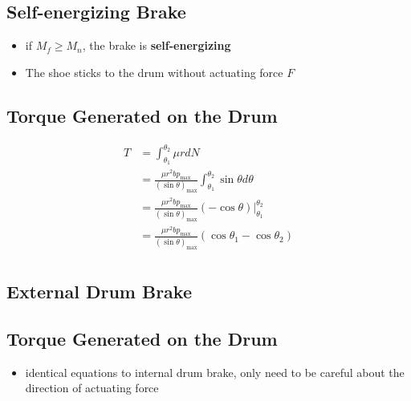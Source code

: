 \documentclass[
10pt,
a4paper,
openany,
svgnames,
]{book}
\begin{document}
\subsection*{Self-energizing Brake}
\label{sec:org67d4715}

\begin{itemize}
\item if \(M_f \geqslant M_n\), the brake is \textbf{self-energizing}

\item The shoe sticks to the drum without actuating force \(F\)
\end{itemize}

\subsection*{Torque Generated on the Drum}
\label{sec:orgd21d3c6}

\begin{align*}
    T &= \int_{\theta_1}^{\theta_2} \mu r dN \\
        &= \frac{\mu r^2 bp_{\max}}{(\sin \theta)_{\max}} \int_{\theta_1}^{\theta_2} \sin \theta d\theta \\
        &= \frac{\mu r^2 bp_{\max}}{(\sin \theta)_{\max}} (-\cos \theta)|_{\theta_1}^{\theta_2} \\
        &= \frac{\mu r^2 bp_{\max}}{(\sin \theta)_{\max}} (\cos \theta_1 - \cos \theta_2) \\
\end{align*}

\subsection*{External Drum Brake}
\label{sec:orgc80bf73}

\begin{center}
\end{center}

\subsection*{Torque Generated on the Drum}
\label{sec:orga41e9b5}

\begin{itemize}
\item identical equations to internal drum brake, only need to be careful about the direction of actuating force
\end{itemize}
\end{document}
